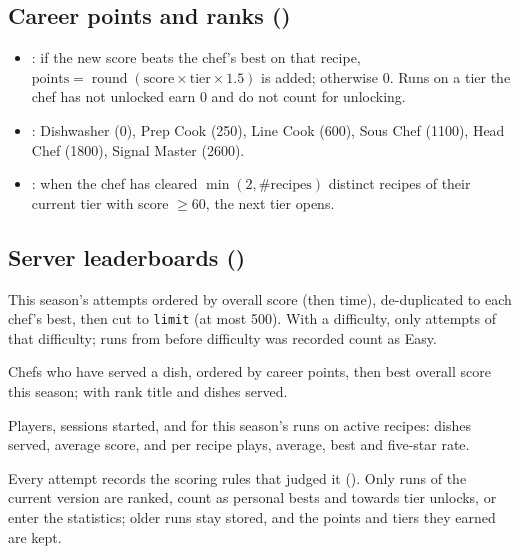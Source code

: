 \documentclass[11pt,a4paper]{article}
\begin{document}
\subsection{Career points and ranks ()}
\begin{itemize}
\item {}: if the new score beats the chef's best on that recipe,
  $\text{points}=\operatorname{round}(\text{score}\times\text{tier}\times1.5)$ is added; otherwise 0.
  Runs on a tier the chef has not unlocked earn 0 and do not count for unlocking.
\item {}: Dishwasher (0), Prep Cook (250), Line Cook (600), Sous Chef (1100),
  Head Chef (1800), Signal Master (2600).
\item {}: when the chef has cleared $\min(2,\#\text{recipes})$ distinct recipes of
  their current tier with score $\ge60$, the next tier opens.
\end{itemize}

\subsection{Server leaderboards ()}
\begin{description}[style=nextline,leftmargin=0.6cm]
\item[\texttt{GET /leaderboard?recipe\_id=\&difficulty=\&limit=}] This season's attempts ordered by
  overall score (then time), de-duplicated to each chef's best, then cut to \texttt{limit}
  (at most 500). With a difficulty, only attempts of that difficulty; runs from before
  difficulty was recorded count as Easy.
\item[\texttt{GET /leaderboard/global}] Chefs who have served a dish, ordered by career points,
  then best overall score this season; with rank title and dishes served.
\item[\texttt{GET /stats}] Players, sessions started, and for this season's runs on active recipes:
  dishes served, average score, and per recipe plays, average, best and five-star rate.
\item[Seasons] Every attempt records the scoring rules that judged it
  (). Only runs of the current version are ranked, count as personal bests
  and towards tier unlocks, or enter the statistics; older runs stay stored, and the points and
  tiers they earned are kept.
\end{description}
\end{document}
